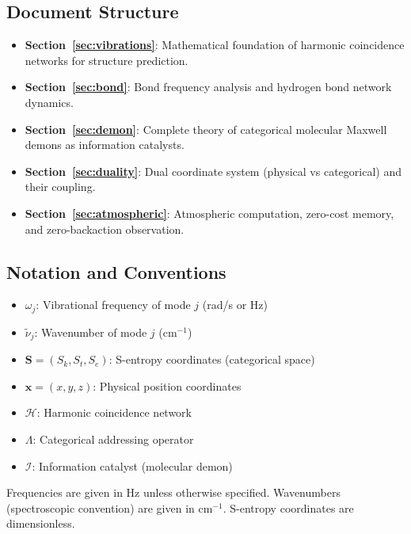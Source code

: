 \documentclass[11pt]{article}
\begin{document}
\subsection{Document Structure}

\begin{itemize}
\item \textbf{Section~\ref{sec:vibrations}}: Mathematical foundation of harmonic coincidence networks for structure prediction.

\item \textbf{Section~\ref{sec:bond}}: Bond frequency analysis and hydrogen bond network dynamics.

\item \textbf{Section~\ref{sec:demon}}: Complete theory of categorical molecular Maxwell demons as information catalysts.

\item \textbf{Section~\ref{sec:duality}}: Dual coordinate system (physical vs categorical) and their coupling.

\item \textbf{Section~\ref{sec:atmospheric}}: Atmospheric computation, zero-cost memory, and zero-backaction observation.
\end{itemize}

\subsection{Notation and Conventions}

\begin{itemize}
\item $\omega_j$: Vibrational frequency of mode $j$ (rad/s or Hz)
\item $\tilde{\nu}_j$: Wavenumber of mode $j$ (cm$^{-1}$)
\item $\mathbf{S} = (S_k, S_t, S_e)$: S-entropy coordinates (categorical space)
\item $\mathbf{x} = (x, y, z)$: Physical position coordinates
\item $\mathcal{H}$: Harmonic coincidence network
\item $\Lambda$: Categorical addressing operator
\item $\mathscr{I}$: Information catalyst (molecular demon)
\end{itemize}

Frequencies are given in Hz unless otherwise specified. Wavenumbers (spectroscopic convention) are given in cm$^{-1}$. S-entropy coordinates are dimensionless.
\end{document}
